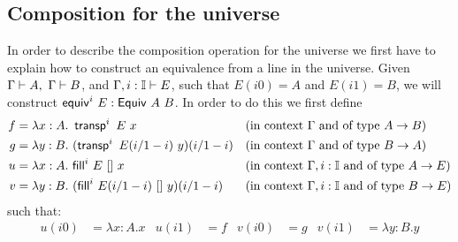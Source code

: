 \subsection{Composition for the universe}\label{subsec:compU}

In order to describe the composition operation for the universe we
first have to explain how to construct an equivalence from a line in
the universe. Given $\Gamma \vdash A,~\Gamma \vdash B$, and
$\Gamma,i:\mathbb{I} \vdash E$, such that $E(i0) = A$ and $E(i1) = B$, we will
construct ${\sf equiv}^i~E : {\sf Equiv}~A~B$. In order to do this we first define
\begin{align*}
  f &= \lambda x:A.~\transport^i~E~x %
  && (\text{in context }\Gamma\text{ and of type } A \to B)
  \\
  g &= \lambda y:B.~(\transport^i~E(i/1-i)~y)(i/1-i) %
  && (\text{in context }\Gamma\text{ and of type } B \to A)
  \\
  u &= \lambda x:A.~\Comp^i~E~[]~x %
  && (\text{in context }\Gamma, i:\II\text{ and of type } A \to E)
  \\
  v &= \lambda y:B.~(\Comp^i~E(i/1-i)~[]~y)(i/1-i) %
  && (\text{in context }\Gamma, i:\II\text{ and of type } B \to E)
\end{align*}
%
such that:
%
\begin{align*}
  u(i0) &= \lambda x:A.x
  &
  u(i1) &= f
  &
  v(i0) &= g
  &
  v(i1) &= \lambda y:B.y
\end{align*}



